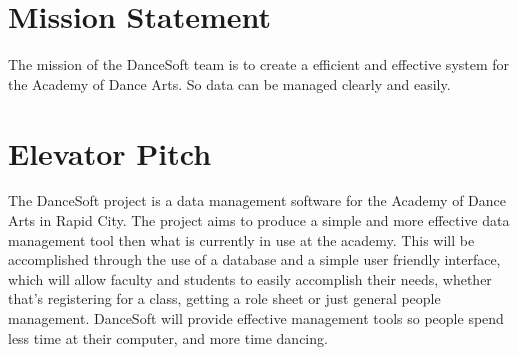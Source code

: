 
\section{Mission Statement}
The mission of the DanceSoft team is to create a efficient and effective system for the Academy of Dance Arts. So data can be managed clearly and easily.

\section{Elevator Pitch}
The DanceSoft project is a data management software for the Academy of Dance Arts in Rapid City. The project aims to produce a simple and more effective data management tool then what is currently in use at the academy. This will be accomplished through the use of a database and a simple user friendly interface, which will allow faculty and students to easily accomplish their needs, whether that's registering for a class, getting a role sheet or just general people management. DanceSoft will provide effective management tools so people spend less time at their computer, and more time dancing. 
